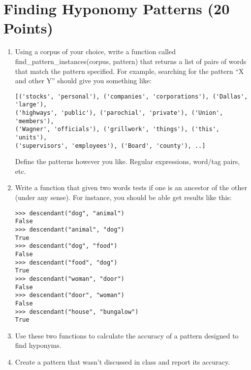 \documentclass[11pt,twoside]{article}
\begin{document}
\section{Finding Hyponomy Patterns (20 Points)}

\begin{enumerate}

\item Using a corpus of your choice, write a function called find\_pattern\_instances(corpus, pattern) that returns  a list of pairs of words that match the pattern specified.  For example, searching for the pattern ``X and other Y'' should give you something like:
\begin{verbatim}
[('stocks', 'personal'), ('companies', 'corporations'), ('Dallas', 'large'), 
('highways', 'public'), ('parochial', 'private'), ('Union', 'members'), 
('Wagner', 'officials'), ('grillwork', 'things'), ('this', 'units'), 
('supervisors', 'employees'), ('Board', 'county'), ..]
\end{verbatim}

Define the patterns however you like.  Regular expressions, word/tag pairs, etc.

\item Write a function that given two words tests if one is an ancestor of the other (under any sense).  For instance, you should be able get results like this:

\begin{verbatim}
>>> descendant("dog", "animal")
False
>>> descendant("animal", "dog")
True
>>> descendant("dog", "food")
False
>>> descendant("food", "dog")
True
>>> descendant("woman", "door")   
False
>>> descendant("door", "woman")
False
>>> descendant("house", "bungalow")
True
\end{verbatim}

\item Use these two functions to calculate the accuracy of a pattern designed to find hyponyms.

\item Create a pattern that wasn't discussed in class and report its accuracy.

\end{enumerate}
\end{document}
